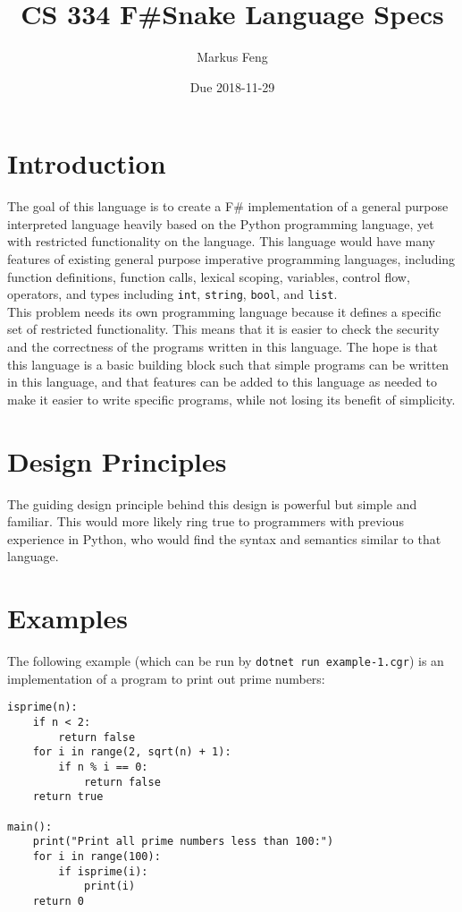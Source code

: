 \documentclass{article}
\title{CS 334 F\#Snake Language Specs}
\author{Markus Feng}
\date{Due 2018-11-29}
\begin{document}
\maketitle

\section{Introduction}
The goal of this language is to create a F\# implementation of a general purpose interpreted language heavily based on the Python programming language, yet with restricted functionality on the language. This language would have many features of existing general purpose imperative programming languages, including function definitions, function calls, lexical scoping, variables, control flow, operators, and types including \texttt{int}, \texttt{string}, \texttt{bool}, and \texttt{list}. \\

This problem needs its own programming language because it defines a specific set of restricted functionality. This means that it is easier to check the security and the correctness of the programs written in this language. The hope is that this language is a basic building block such that simple programs can be written in this language, and that features can be added to this language as needed to make it easier to write specific programs, while not losing its benefit of simplicity.

\section{Design Principles}
The guiding design principle behind this design is powerful but simple and familiar. This would more likely ring true to programmers with previous experience in Python, who would find the syntax and semantics similar to that language.

\section{Examples}
The following example (which can be run by \texttt{dotnet run example-1.cgr}) is an implementation of a program to print out prime numbers:
\begin{lstlisting}[style=fssnake]
isprime(n):
    if n < 2:
        return false
    for i in range(2, sqrt(n) + 1):
        if n % i == 0:
            return false
    return true

main():
    print("Print all prime numbers less than 100:")
    for i in range(100):
        if isprime(i):
            print(i)
    return 0
\end{lstlisting}
\end{document}
